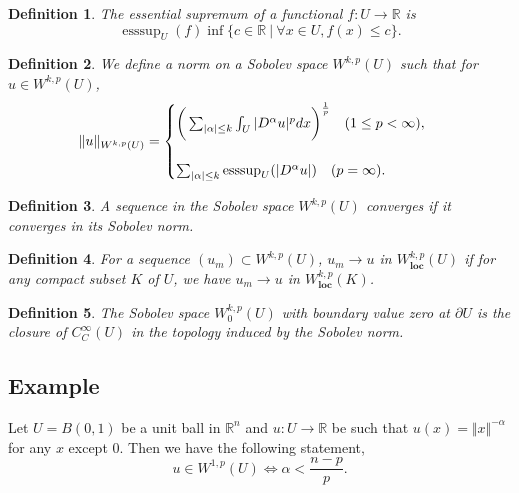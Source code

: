 \documentclass{article}
\newtheorem{definition}{Definition}[section]
\numberwithin{equation}{section}
\DeclareMathOperator{\esssup}{esssup}
\begin{document}
\begin{definition}
The essential supremum of a functional $f:U\to\mathbb{R}$ is 
\begin{equation*}
\esssup_U(f)\inf\{c\in\mathbb{R}\:|\: \forall x\in U, f(x)\leq c\}.
\end{equation*}
\end{definition}

\begin{definition}
We define a norm on a Sobolev space $W^{k,p}(U)$ such that for $u\in W^{k,p}(U)$,
\begin{equation*}
\Vert u \Vert_{W^{k,p}(U)} = 
\begin{cases}
\bigg{(}\sum_{|\alpha|\leq k} \int_U|D^\alpha u|^pdx\bigg{)}^{{\frac 1 p}}\quad(1\leq p<\infty),\\
\\
\sum_{|\alpha|\leq k}\esssup_U(|D^\alpha u|)\quad(p=\infty).
\end{cases}
\end{equation*}
\end{definition}

\begin{definition}
A sequence in the Sobolev space $W^{k,p}(U)$ converges if it converges in its Sobolev norm.
\end{definition}

\begin{definition}
For a sequence $(u_m)\subset W^{k,p}(U)$, $u_m\to u$ in $W_{\mathbf{loc}}^{k,p}(U)$ if for any compact subset $K$ of $U$, we have $u_m\to u$ in $W_{\mathbf{loc}}^{k,p}(K)$.
\end{definition}

\begin{definition}
The Sobolev space $W^{k,p}_0(U)$ with boundary value zero at $\partial U$  is the closure of $C^{\infty}_C(U)$ in the topology induced by the Sobolev norm.
\end{definition}

\subsection{Example}

Let $U=B(0,1)$ be a unit ball in $\mathbb{R}^n$ and $u:U\to\mathbb{R}$ be such that $u(x) = \Vert x \Vert ^{-\alpha}$ for any $x$ except $0$. Then we have the following statement,
\begin{equation*}
u\in W^{1,p}(U)\Leftrightarrow \alpha<{\frac {n-p} {p}}.
\end{equation*}
\end{document}
